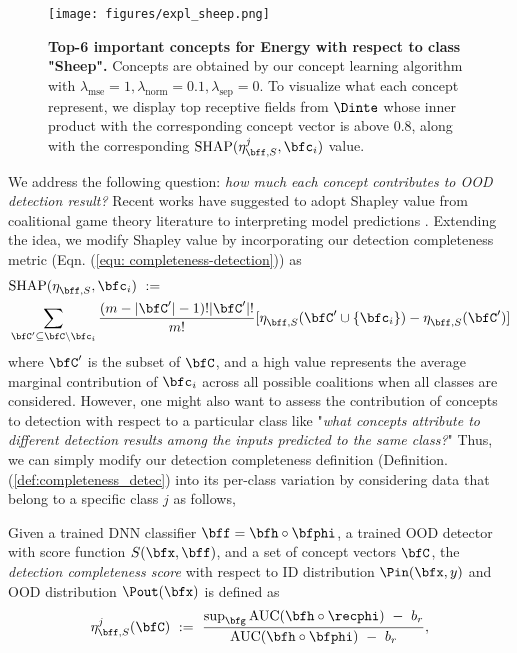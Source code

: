 \begin{figure}[tb]
\centering
\texttt{[image: figures/expl\_sheep.png]}
\vspace{-9mm}
\caption{\small \textbf{Top-6 important concepts for Energy with respect to class "Sheep".}
Concepts are obtained by our concept learning algorithm with $\lambda_\textrm{mse} = 1, \lambda_\textrm{norm} = 0.1, \lambda_\textrm{sep} = 0$.
To visualize what each concept represent, we display top receptive fields from $\Dinte$ whose inner product with the corresponding concept vector is above 0.8, along with the corresponding $\textrm{SHAP}(\eta^{j}_{\bff, S}, \bfc_i)$ value.}
\vspace{-5mm}
\label{fig:shap_sheep}
\end{figure}
We address the following question: \textit{how much each concept contributes to OOD detection result?}
Recent works have suggested to adopt Shapley value from coalitional game theory literature \cite{shapley1953value,fujimoto2006axiomatic} to interpreting model predictions \cite{chen2018shapley,lundberg2017shapley,sundararajan2020shapley}.
Extending the idea, we modify Shapley value by incorporating our detection completeness metric (Eqn. (\ref{equ: completeness-detection})) as
\begin{align}
    \label{equ: ConceptSHAP}
    &\textrm{SHAP}(\eta^{}_{\bff, S}, 
    \bfc_i)  ~:= \nonumber \\
    &\sum_{\bfC' \subseteq \bfC \setminus \bfc_i} \frac{(m - |\bfC'| - 1)! |\bfC'|!}{m!} [\eta^{}_{\bff, S}(\bfC' \cup \{\bfc_i\}) - \eta^{}_{\bff, S}(\bfC')]
\end{align}
where $\bfC'$ is the subset of $\bfC$, and a high value represents the average marginal contribution of $\bfc_i$ across all possible coalitions when all classes are considered.
However, one might also want to assess the contribution of concepts to detection with respect to a particular class like "\textit{what concepts attribute to different detection results among the inputs predicted to the same class?}"
Thus, we can simply modify our detection completeness definition (Definition. (\ref{def:completeness_detec}) into its per-class variation by considering data that belong to a specific class $j$ as follows,
\begin{definition}
\label{def:completeness_detec_perclass}
Given a trained DNN classifier $\bff = \bfh \circ \bfphi$, a trained OOD detector with score function $S(\bfx, \bff)$, and a set of concept vectors $\bfC$, the {\em detection completeness score} with respect to ID distribution $\Pin(\bfx, y)$ and OOD distribution $\Pout(\bfx)$ is defined as
\begin{align}
\label{equ: completeness-detection-perclass}
    \eta^{j}_{\bff, S}(\bfC) 
    ~:=~ \frac{\textrm{sup}_\bfg \,\textrm{AUC}(\bfh \circ \recphi) ~-~ b_r}{\textrm{AUC}(\bfh \circ \bfphi) ~-~ b_r},
\end{align}
\end{definition}
